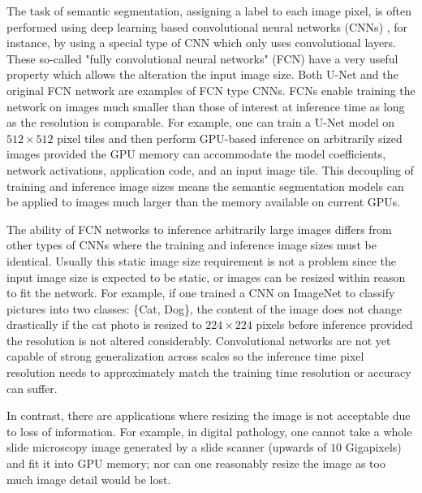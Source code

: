 \documentclass[runningheads]{llncs}
\begin{document}
The task of semantic segmentation, assigning a label to each image pixel, is often performed using deep learning based convolutional neural networks (CNNs) \cite{Badrinarayanan2015a,Ronneberger2015a}, for instance, by using a special type of CNN which only uses convolutional layers.
These so-called "fully convolutional neural networks" (FCN) have a very useful property which allows the alteration the input image size. 
Both U-Net \cite{Ronneberger2015a} and the original FCN network \cite{Long2015} are examples of FCN type CNNs. 
FCNs enable training the network on images much smaller than those of interest at inference time as long as the resolution is comparable. 
For example, one can train a U-Net model on $512 \times 512$ pixel tiles and then perform GPU-based inference on arbitrarily sized images provided the GPU memory can accommodate the model coefficients, network activations, application code, and an input image tile. This decoupling of training and inference image sizes means the semantic segmentation models can be applied to images much larger than the memory available on current GPUs. 

The ability of FCN networks to inference arbitrarily large images differs from other types of CNNs where the training and inference image sizes must be identical. Usually this static image size requirement is not a problem since the input image size is expected to be static, or images can be resized within reason to fit the network. For example, if one trained a CNN on ImageNet \cite{Russakovsky2015} to classify pictures into two classes: \{Cat, Dog\}, the content of the image does not change drastically if the cat photo is resized to $224 \times 224$ pixels before inference provided the resolution is not altered considerably. Convolutional networks are not yet capable of strong generalization across scales \cite{Jaderberg2015,Lin2017a} so the inference time pixel resolution needs to approximately match the training time resolution or accuracy can suffer.

In contrast, there are applications where resizing the image is not acceptable due to loss of information. For example, in digital pathology, one cannot take a whole slide microscopy image generated by a slide scanner (upwards of $\num{10}$ Gigapixels) and fit it into GPU memory; nor can one reasonably resize the image as too much image detail would be lost. 
\end{document}
